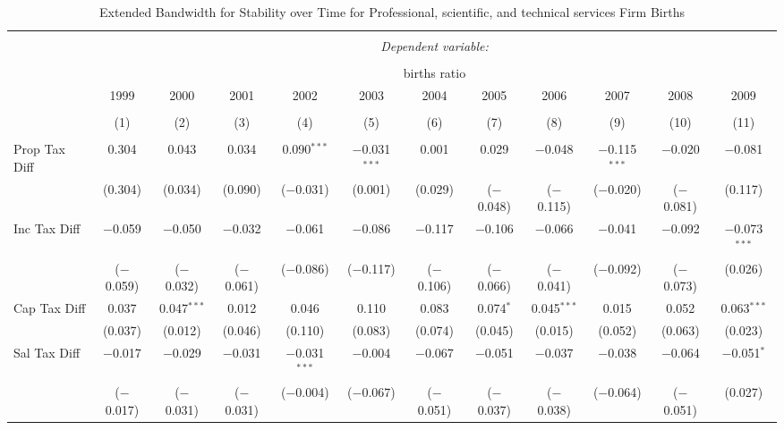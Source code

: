 
\begin{table}[!htbp] \centering 
  \caption{Extended Bandwidth for Stability over Time for  Professional, scientific, and technical services Firm Births} 
  \label{54year} 
\small 
\begin{tabular}{@{\extracolsep{5pt}}lccccccccccc} 
\\[-1.8ex]\hline 
\hline \\[-1.8ex] 
 & \multicolumn{11}{c}{\textit{Dependent variable:}} \\ 
\cline{2-12} 
\\[-1.8ex] & \multicolumn{11}{c}{births ratio} \\ 
 & 1999 & 2000 & 2001 & 2002 & 2003 & 2004 & 2005 & 2006 & 2007 & 2008 & 2009 \\ 
\\[-1.8ex] & (1) & (2) & (3) & (4) & (5) & (6) & (7) & (8) & (9) & (10) & (11)\\ 
\hline \\[-1.8ex] 
 Prop Tax Diff & 0.304 & 0.043 & 0.034 & 0.090$^{***}$ & $-$0.031$^{***}$ & 0.001 & 0.029 & $-$0.048 & $-$0.115$^{***}$ & $-$0.020 & $-$0.081 \\ 
  & (0.304) & (0.034) & (0.090) & ($-$0.031) & (0.001) & (0.029) & ($-$0.048) & ($-$0.115) & ($-$0.020) & ($-$0.081) & (0.117) \\ 
  Inc Tax Diff & $-$0.059 & $-$0.050 & $-$0.032 & $-$0.061 & $-$0.086 & $-$0.117 & $-$0.106 & $-$0.066 & $-$0.041 & $-$0.092 & $-$0.073$^{***}$ \\ 
  & ($-$0.059) & ($-$0.032) & ($-$0.061) & ($-$0.086) & ($-$0.117) & ($-$0.106) & ($-$0.066) & ($-$0.041) & ($-$0.092) & ($-$0.073) & (0.026) \\ 
  Cap Tax Diff & 0.037 & 0.047$^{***}$ & 0.012 & 0.046 & 0.110 & 0.083 & 0.074$^{*}$ & 0.045$^{***}$ & 0.015 & 0.052 & 0.063$^{***}$ \\ 
  & (0.037) & (0.012) & (0.046) & (0.110) & (0.083) & (0.074) & (0.045) & (0.015) & (0.052) & (0.063) & (0.023) \\ 
  Sal Tax Diff & $-$0.017 & $-$0.029 & $-$0.031 & $-$0.031$^{***}$ & $-$0.004 & $-$0.067 & $-$0.051 & $-$0.037 & $-$0.038 & $-$0.064 & $-$0.051$^{*}$ \\ 
  & ($-$0.017) & ($-$0.031) & ($-$0.031) & ($-$0.004) & ($-$0.067) & ($-$0.051) & ($-$0.037) & ($-$0.038) & ($-$0.064) & ($-$0.051) & (0.027) \\ 

\end{tabular}
\end{table}
